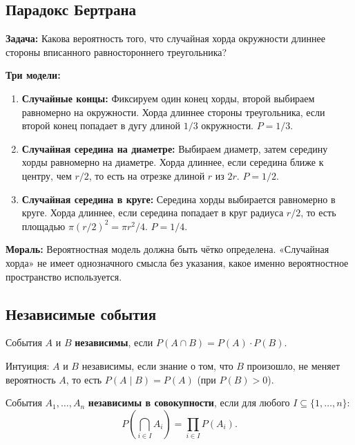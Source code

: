 \documentclass[12pt]{article}
\begin{document}
	\subsection{Парадокс Бертрана}
	
	\textbf{Задача:} Какова вероятность того, что случайная хорда окружности длиннее стороны вписанного равностороннего треугольника?
	
	\textbf{Три модели:}
	\begin{enumerate}
		\item \textbf{Случайные концы:} Фиксируем один конец хорды, второй выбираем равномерно на окружности. Хорда длиннее стороны треугольника, если второй конец попадает в дугу длиной $1/3$ окружности. $P = 1/3$.
		\item \textbf{Случайная середина на диаметре:} Выбираем диаметр, затем середину хорды равномерно на диаметре. Хорда длиннее, если середина ближе к центру, чем $r/2$, то есть на отрезке длиной $r$ из $2r$. $P = 1/2$.
		\item \textbf{Случайная середина в круге:} Середина хорды выбирается равномерно в круге. Хорда длиннее, если середина попадает в круг радиуса $r/2$, то есть площадью $\pi(r/2)^2 = \pi r^2/4$. $P = 1/4$.
	\end{enumerate}
	
	\textbf{Мораль:} Вероятностная модель должна быть чётко определена. «Случайная хорда» не имеет однозначного смысла без указания, какое именно вероятностное пространство используется.
	
	\subsection{Независимые события}
	
	\begin{definition}
		События $A$ и $B$ \textbf{независимы}, если $P(A \cap B) = P(A) \cdot P(B)$.
	\end{definition}
	
	\begin{note}
		Интуиция: $A$ и $B$ независимы, если знание о том, что $B$ произошло, не меняет вероятность $A$, то есть $P(A \mid B) = P(A)$ (при $P(B) > 0$).
	\end{note}
	
	\begin{definition}
		События $A_1, \dots, A_n$ \textbf{независимы в совокупности}, если для любого $I \subseteq \{1, \dots, n\}$:
		\[P\!\left(\bigcap_{i \in I} A_i\right) = \prod_{i \in I} P(A_i).\]
	\end{definition}
	
\end{document}
